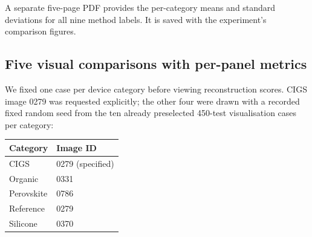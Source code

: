 \documentclass[a4paper,10pt]{article}
\begin{document}
\begin{table}[H]
\centering\tiny
{}
\caption{Per-category mean PSNR (dB) over 90 test images per category.
The complete 450-image row-level metrics are retained separately as CSV.}
\end{table}

A separate five-page PDF provides the per-category means and standard deviations for all nine method labels. It is saved with the experiment's comparison figures.

\subsection*{Five visual comparisons with per-panel metrics}

We fixed one case per device category before viewing reconstruction scores.
CIGS image 0279 was requested explicitly; the other four were drawn with
a recorded fixed random seed from the ten already preselected 450-test
visualisation cases per category:

\begin{center}
\begin{tabular}{@{}ll@{}}
\toprule
\textbf{Category}&\textbf{Image ID}\\
\midrule
CIGS&0279 (specified)\\
Organic&0331\\
Perovskite&0786\\
Reference&0279\\
Silicone&0370\\
\bottomrule
\end{tabular}
\end{center}
\end{document}
